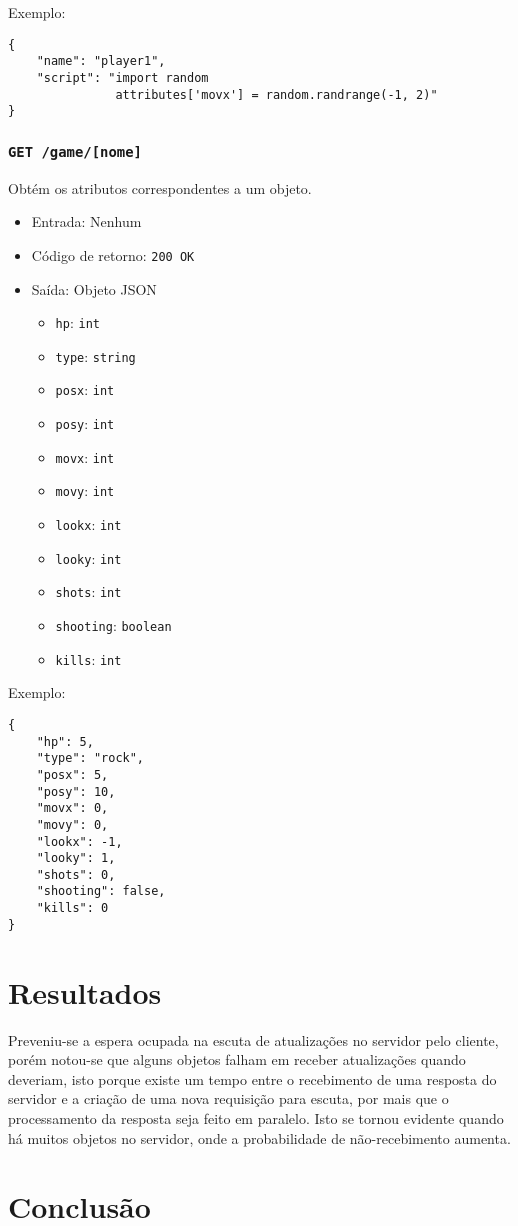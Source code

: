 \documentclass[12pt,a4paper]{article}
\begin{document}
Exemplo:

\begin{verbatim}
{
    "name": "player1",
    "script": "import random
               attributes['movx'] = random.randrange(-1, 2)"
}
\end{verbatim}

\subsubsection{\texttt{GET /game/[nome]}}

Obtém os atributos correspondentes a um objeto.

\begin{itemize}
	\item Entrada: Nenhum
	\item Código de retorno: \texttt{200 OK}
	\item Saída: Objeto JSON
		\begin{itemize}
			\item \texttt{hp}: \texttt{int}
			\item \texttt{type}: \texttt{string}
			\item \texttt{posx}: \texttt{int}
			\item \texttt{posy}: \texttt{int}
			\item \texttt{movx}: \texttt{int}
			\item \texttt{movy}: \texttt{int}
			\item \texttt{lookx}: \texttt{int}
			\item \texttt{looky}: \texttt{int}
			\item \texttt{shots}: \texttt{int}
			\item \texttt{shooting}: \texttt{boolean}
			\item \texttt{kills}: \texttt{int}
		\end{itemize}
\end{itemize}

Exemplo:

\begin{verbatim}
{
    "hp": 5,
    "type": "rock",
    "posx": 5,
    "posy": 10,
    "movx": 0,
    "movy": 0,
    "lookx": -1,
    "looky": 1,
    "shots": 0,
    "shooting": false,
    "kills": 0
}
\end{verbatim}

\pagebreak \section{Resultados}

Preveniu-se a espera ocupada na escuta de atualizações no servidor pelo
cliente, porém notou-se que alguns objetos falham em receber atualizações
quando deveriam, isto porque existe um tempo entre o recebimento de uma
resposta do servidor e a criação de uma nova requisição para escuta, por mais
que o processamento da resposta seja feito em paralelo. Isto se tornou evidente
quando há muitos objetos no servidor, onde a probabilidade de não-recebimento
aumenta.

\pagebreak \section{Conclusão}

%
%
\end{document}
